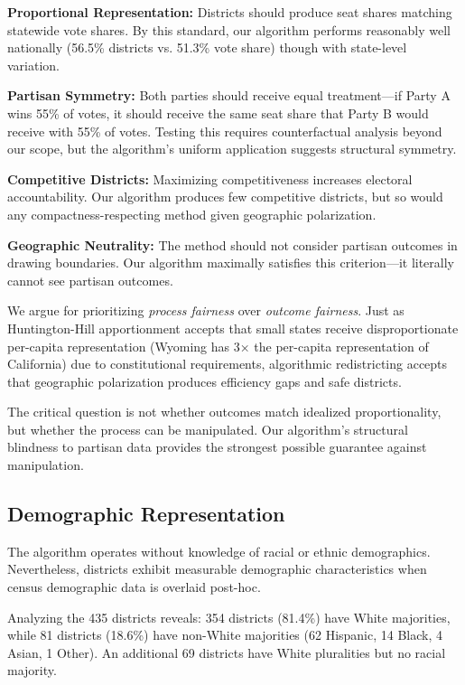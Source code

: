 \textbf{Proportional Representation:} Districts should produce seat shares matching statewide vote shares. By this standard, our algorithm performs reasonably well nationally (56.5\% districts vs. 51.3\% vote share) though with state-level variation.

\textbf{Partisan Symmetry:} Both parties should receive equal treatment—if Party A wins 55\% of votes, it should receive the same seat share that Party B would receive with 55\% of votes. Testing this requires counterfactual analysis beyond our scope, but the algorithm's uniform application suggests structural symmetry.

\textbf{Competitive Districts:} Maximizing competitiveness increases electoral accountability. Our algorithm produces few competitive districts, but so would any compactness-respecting method given geographic polarization.

\textbf{Geographic Neutrality:} The method should not consider partisan outcomes in drawing boundaries. Our algorithm maximally satisfies this criterion—it literally cannot see partisan outcomes.

We argue for prioritizing \textit{process fairness} over \textit{outcome fairness}. Just as Huntington-Hill apportionment accepts that small states receive disproportionate per-capita representation (Wyoming has 3× the per-capita representation of California) due to constitutional requirements, algorithmic redistricting accepts that geographic polarization produces efficiency gaps and safe districts.

The critical question is not whether outcomes match idealized proportionality, but whether the process can be manipulated. Our algorithm's structural blindness to partisan data provides the strongest possible guarantee against manipulation.

\subsection{Demographic Representation}

The algorithm operates without knowledge of racial or ethnic demographics. Nevertheless, districts exhibit measurable demographic characteristics when census demographic data is overlaid post-hoc.

Analyzing the 435 districts reveals: 354 districts (81.4\%) have White majorities, while 81 districts (18.6\%) have non-White majorities (62 Hispanic, 14 Black, 4 Asian, 1 Other). An additional 69 districts have White pluralities but no racial majority.

